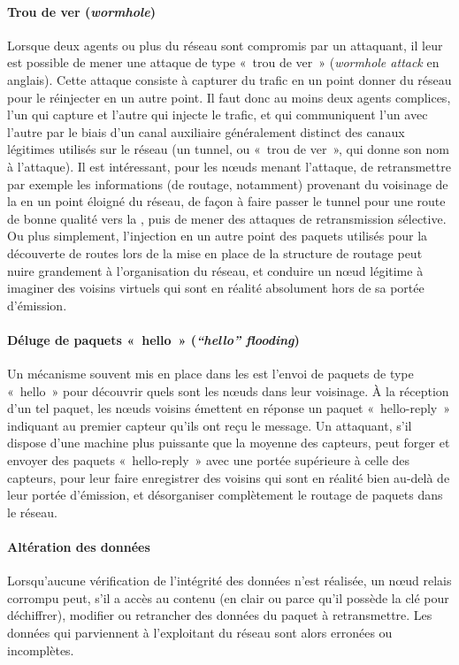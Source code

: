        \paragraph{Trou de ver (\textit{wormhole})}
Lorsque deux agents ou plus du réseau sont compromis par un attaquant, il leur est possible de mener une attaque de type « trou de ver » (\textit{wormhole attack} en anglais).
Cette attaque consiste à capturer du trafic en un point donner du réseau pour le réinjecter en un autre point.
Il faut donc au moins deux agents complices, l'un qui capture et l'autre qui injecte le trafic, et qui communiquent l'un avec l'autre par le biais d'un canal auxiliaire généralement distinct des canaux légitimes utilisés sur le réseau (un tunnel, ou « trou de ver », qui donne son nom à l'attaque).
Il est intéressant, pour les nœuds menant l'attaque, de retransmettre par exemple les informations (de routage, notamment) provenant du voisinage de la \sdb en un point éloigné du réseau, de façon à faire passer le tunnel pour une route de bonne qualité vers la \sdb, puis de mener des attaques de retransmission sélective.
Ou plus simplement, l'injection en un autre point des paquets utilisés pour la découverte de routes lors de la mise en place de la structure de routage peut nuire grandement à l'organisation du réseau, et conduire un nœud légitime à imaginer des voisins virtuels qui sont en réalité absolument hors de sa portée d'émission.

        \paragraph{Déluge de paquets « hello » (\textit{“hello” flooding})}
Un mécanisme souvent mis en place dans les \rcs est l'envoi de paquets de type « hello » pour découvrir quels sont les nœuds dans leur voisinage.
À la réception d'un tel paquet, les nœuds voisins émettent en réponse un paquet « hello-reply » indiquant au premier capteur qu'ils ont reçu le message.
Un attaquant, s'il dispose d'une machine plus puissante que la moyenne des capteurs, peut forger et envoyer des paquets « hello-reply » avec une portée supérieure à celle des capteurs, pour leur faire enregistrer des voisins qui sont en réalité bien au-delà de leur portée d'émission, et désorganiser complètement le routage de paquets dans le réseau.

        \paragraph{Altération des données}
Lorsqu'aucune vérification de l'intégrité des données n'est réalisée, un nœud relais corrompu peut, s'il a accès au contenu (en clair ou parce qu'il possède la clé pour déchiffrer), modifier ou retrancher des données du paquet à retransmettre.
Les données qui parviennent à l'exploitant du réseau sont alors erronées ou incomplètes.

